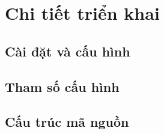 \chapter{Chi tiết triển khai}
\section{Cài đặt và cấu hình}
\section{Tham số cấu hình}
\section{Cấu trúc mã nguồn}
